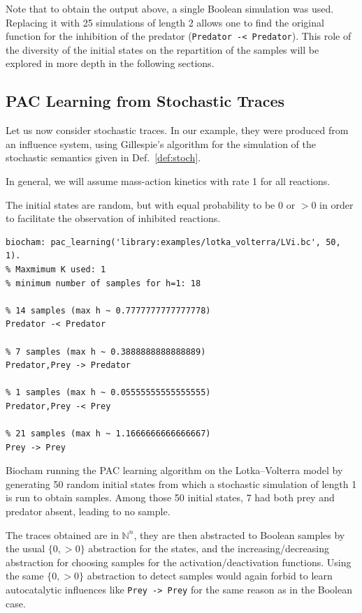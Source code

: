 \documentclass{llncs}
\newif\ifcomments%
\newcommand{\francois}[1]{\ifcomments\textcolor{blue}{#1}\fi}
\begin{document}
Note that to obtain the output above, a single Boolean simulation was used.
Replacing it with 25 simulations of length 2 allows one to find the original
function for the inhibition of the predator (\texttt{Predator -< Predator}).
This role of the diversity of the initial states on the repartition of the
samples will be explored in more depth in the following sections.

\subsection{PAC Learning from  Stochastic Traces}


\francois{On doit etre clair sur la nature des traces considerees (seuils/activation boolleenne/stochastique). Je focaliserais sur trace stochastique et semantique booleenne d'activation.}

Let us now consider stochastic traces. In our example, they were
produced from an influence system, using Gillespie's
algorithm for the simulation of the stochastic semantics given in
Def.~\ref{def:stoch}.

In general, we will assume mass-action kinetics with rate 1 for all reactions.

The initial states are random, but with equal probability to be 0 or $>0$ in
order to facilitate the observation of inhibited reactions.

\begin{listfig}[htb]
      \begin{lstlisting}
biocham: pac_learning('library:examples/lotka_volterra/LVi.bc', 50, 1).
% Maxmimum K used: 1
% minimum number of samples for h=1: 18

% 14 samples (max h ~ 0.7777777777777778)
Predator -< Predator

% 7 samples (max h ~ 0.3888888888888889)
Predator,Prey -> Predator

% 1 samples (max h ~ 0.05555555555555555)
Predator,Prey -< Prey

% 21 samples (max h ~ 1.1666666666666667)
Prey -> Prey
   \end{lstlisting}
   \caption{Biocham running the PAC learning algorithm on the Lotka--Volterra
      model by generating 50 random initial states from which a stochastic
      simulation of length 1 is run to obtain samples. Among those 50 initial
     states, 7 had both prey and predator absent, leading to no sample.}\label{lst:stoch_lv}
\end{listfig}

The traces obtained are in ${\mathbb{N}}^n$, they are then abstracted to
Boolean samples by the usual $\{0, >0\}$ abstraction for the states, and the
increasing/decreasing abstraction for choosing samples for the
activation/deactivation functions. Using the same $\{0, >0\}$ abstraction to
detect samples would again forbid to learn autocatalytic influences like
\texttt{Prey -> Prey} for the same reason as in the Boolean case.
\end{document}
